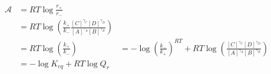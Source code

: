 \begin{eqnarray}\label{eqn:reaction-affinity-ratio}
\mathcal A &= RT\log\frac{r_+}{r_-} \\
& = RT\log\left(\frac{k_+}{k_-}\frac{[C]^{\gamma_C}[D]^{\gamma_D}}{[A]^{\gamma_A}[B]^{\gamma_B}}\right) \\
& = RT\log\left(\frac{k_+}{k_-}\right) 
& = -\log\left(\frac{k_-}{k_+}\right)^{RT} + RT\log\left(\frac{[C]^{\gamma_C}[D]^{\gamma_D}}{[A]^{\gamma_A}[B]^{\gamma_B}}\right) \\
& = -\log K_{eq} + RT\log{Q_r} \\
\end{eqnarray}